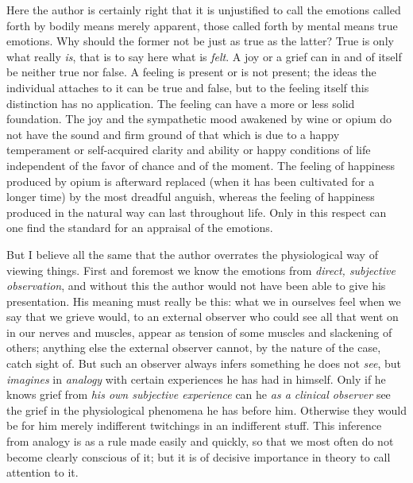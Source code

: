 \documentclass[12pt,a4paper,openany]{book}
\newcommand{\opage}[1]{\marginnote{\footnotesize\textit{[#1]}}}
\begin{document}
\opage{55}Here the author is certainly right that it is unjustified
to call the emotions called forth by bodily means merely
apparent, those called forth by mental means true
emotions. Why should the former not be just as true
as the latter? True is only what really \emph{is}, that is to say here
what is \emph{felt}. A joy or a grief can in and of itself be neither
true nor false. A feeling is present or is not
present; the ideas the individual attaches to it can
be true and false, but to the feeling itself this
distinction has no application. The feeling can have a more or
less solid foundation. The joy and the sympathetic
mood awakened by wine or opium do not have the
sound and firm ground of that which is due to a happy
temperament or self-acquired clarity and ability or
happy conditions of life independent of the favor of chance and of the moment.
The feeling of happiness produced by opium is afterward replaced
(when it has been cultivated for a longer time) by the most
dreadful anguish, whereas the feeling of happiness produced in the natural way
can last throughout life. Only in this
respect can one find the standard for an appraisal of
the emotions.

But I believe all the same that the author overrates the
physiological way of viewing things. First and foremost we know
the emotions from \emph{direct, subjective observation}, and without
this the author would not have been able to give his presentation.
His meaning must really be this: what we in ourselves
feel when we say that we grieve would, to an external observer
who could see all that went on in our nerves and muscles,
appear as tension of some muscles and slackening of
others; anything else the external observer cannot, by the nature of the case,
catch sight of. But such an observer always infers
something he does not \emph{see}, but \emph{imagines} in \emph{analogy} with certain
experiences he has had in himself. Only if he knows grief from \emph{his own
subjective experience} can he \emph{as a clinical
observer} see the grief in the physiological phenomena he has before him.
Otherwise they would be for him merely indifferent twitchings in
an indifferent stuff. This inference from analogy is as a rule made easily
and quickly, so that we most often do not become clearly conscious of it; but
\opage{56}it is of decisive importance in theory to call
attention to it.
\end{document}
